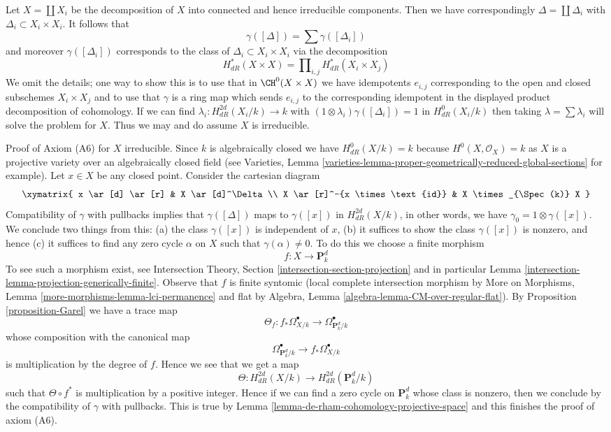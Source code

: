 \medskip\noindent
Let $X = \coprod X_i$ be the decomposition of $X$ into connected
and hence irreducible components. Then we have correspondingly
$\Delta = \coprod \Delta_i$ with $\Delta_i \subset X_i \times X_i$.
It follows that
$$
\gamma([\Delta]) = \sum \gamma([\Delta_i])
$$
and moreover $\gamma([\Delta_i])$ corresponds to the class of
$\Delta_i \subset X_i \times X_i$ via the decomposition
$$
H^*_{dR}(X \times X) = \prod\nolimits_{i, j} H^*_{dR}(X_i \times X_j)
$$
We omit the details; one way to show this is to use that in
$\CH^0(X \times X)$ we have idempotents $e_{i, j}$ corresponding to
the open and closed subschemes $X_i \times X_j$ and to use that
$\gamma$ is a ring map which sends $e_{i, j}$ to the corresponding
idempotent in the displayed product decomposition of cohomology.
If we can find $\lambda_i : H_{dR}^{2d}(X_i/k) \to k$ with
$(1 \otimes \lambda_i)\gamma([\Delta_i]) = 1$ in $H^0_{dR}(X_i/k)$
then taking $\lambda = \sum \lambda_i$ will solve the problem for $X$.
Thus we may and do assume $X$ is irreducible.

\medskip\noindent
Proof of Axiom (A6) for $X$ irreducible. Since $k$ is algebraically
closed we have $H^0_{dR}(X/k) = k$ because $H^0(X, \mathcal{O}_X) = k$
as $X$ is a projective variety over an algebraically closed field
(see Varieties, Lemma
\ref{varieties-lemma-proper-geometrically-reduced-global-sections}
for example). Let $x \in X$ be any closed point.
Consider the cartesian diagram
$$
\xymatrix{
x \ar[d] \ar[r] & X \ar[d]^\Delta \\
X \ar[r]^-{x \times \text{id}} & X \times_{\Spec(k)} X
}
$$
Compatibility of $\gamma$ with pullbacks implies that
$\gamma([\Delta])$ maps to $\gamma([x])$ in $H_{dR}^{2d}(X/k)$,
in other words, we have $\gamma_0 = 1 \otimes \gamma([x])$.
We conclude two things from this: (a) the class
$\gamma([x])$ is independent of $x$, (b) it suffices
to show the class $\gamma([x])$ is nonzero, and hence (c)
it suffices to find any zero cycle $\alpha$ on $X$ such that
$\gamma(\alpha) \not = 0$. To do this we choose a finite
morphism
$$
f : X \longrightarrow \mathbf{P}^d_k
$$
To see such a morphism exist, see
Intersection Theory, Section \ref{intersection-section-projection}
and in particular Lemma \ref{intersection-lemma-projection-generically-finite}.
Observe that $f$ is finite syntomic (local complete intersection morphism
by More on Morphisms, Lemma \ref{more-morphisms-lemma-lci-permanence}
and flat by Algebra, Lemma \ref{algebra-lemma-CM-over-regular-flat}).
By Proposition \ref{proposition-Garel} we have a trace map
$$
\Theta_f :
f_*\Omega^\bullet_{X/k}
\longrightarrow
\Omega^\bullet_{\mathbf{P}^d_k/k}
$$
whose composition with the canonical map
$$
\Omega^\bullet_{\mathbf{P}^d_k/k}
\longrightarrow
f_*\Omega^\bullet_{X/k}
$$
is multiplication by the degree of $f$. Hence we see that we get a map
$$
\Theta : H_{dR}^{2d}(X/k) \to H_{dR}^{2d}(\mathbf{P}^d_k/k)
$$
such that $\Theta \circ f^*$ is multiplication by a positive integer.
Hence if we can find a zero cycle on $\mathbf{P}^d_k$ whose class
is nonzero, then we conclude by the compatibility of $\gamma$
with pullbacks. This is true by
Lemma \ref{lemma-de-rham-cohomology-projective-space} and this
finishes the proof of axiom (A6).

